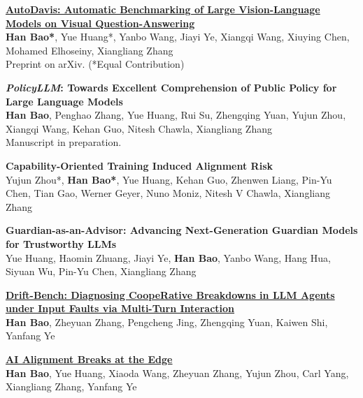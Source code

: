 \documentclass[a4paper,11pt]{article}
\begin{document}
{\begin{enumerate}[leftmargin=*, labelsep=0.8em, align=left, widest={[\textbf{S.11}]}, itemindent=0em]
\item[\textcolor{ndgold}{\textbf{[S.1]}}]
\href{https://arxiv.org/pdf/2410.21259}{\textbf{AutoDavis: Automatic Benchmarking of Large Vision-Language Models on Visual Question-Answering}} \\
\textbf{Han Bao*}, Yue Huang*, Yanbo Wang, Jiayi Ye, Xiangqi Wang, Xiuying Chen, Mohamed Elhoseiny, Xiangliang Zhang \\
Preprint on arXiv. (*Equal Contribution)

\item[\textcolor{ndgold}{\textbf{[S.2]}}]
\textbf{\textit{PolicyLLM}: Towards Excellent Comprehension of Public Policy for Large Language Models} \\
\textbf{Han Bao}, Penghao Zhang, Yue Huang, Rui Su, Zhengqing Yuan, Yujun Zhou, Xiangqi Wang, Kehan Guo, Nitesh Chawla, Xiangliang Zhang \\
Manuscript in preparation.

\item[\textcolor{ndgold}{\textbf{[S.3]}}]
\textbf{Capability-Oriented Training Induced Alignment Risk} \\
Yujun Zhou*, \textbf{Han Bao*}, Yue Huang, Kehan Guo, Zhenwen Liang, Pin-Yu Chen, Tian Gao, Werner Geyer, Nuno Moniz, Nitesh V Chawla, Xiangliang Zhang \\

\item[\textcolor{ndgold}{\textbf{[S.4]}}]
\textbf{Guardian-as-an-Advisor: Advancing Next-Generation Guardian Models for Trustworthy LLMs} \\
Yue Huang, Haomin Zhuang, Jiayi Ye, \textbf{Han Bao}, Yanbo Wang, Hang Hua, Siyuan Wu, Pin-Yu Chen, Xiangliang Zhang \\

\item[\textcolor{ndgold}{\textbf{[S.5]}}]
\href{https://arxiv.org/pdf/2602.02455}{\textbf{Drift-Bench: Diagnosing CoopeRative Breakdowns in LLM Agents under Input Faults via Multi-Turn Interaction}} \\
\textbf{Han Bao}, Zheyuan Zhang, Pengcheng Jing, Zhengqing Yuan, Kaiwen Shi, Yanfang Ye \\

\item[\textcolor{ndgold}{\textbf{[S.6]}}]
\href{https://arxiv.org/pdf/2602.20042}{\textbf{AI Alignment Breaks at the Edge}} \\
\textbf{Han Bao}, Yue Huang, Xiaoda Wang, Zheyuan Zhang, Yujun Zhou, Carl Yang, Xiangliang Zhang, Yanfang Ye \\


\end{enumerate}}
\end{document}
